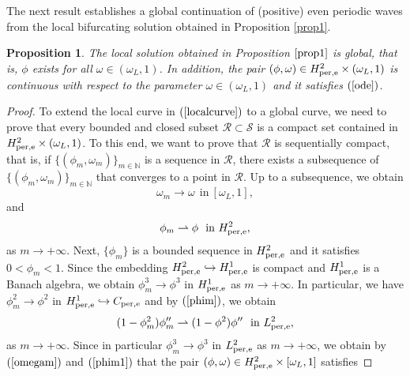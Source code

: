 \documentclass[12pt,reqno]{amsart}
\numberwithin{equation}{section}
\numberwithin{figure}{section}
\newtheorem{proposition}[theorem]{Proposition}
\begin{document}
The next result establishes a global continuation of (positive) even periodic waves from the local bifurcating solution obtained in Proposition \ref{prop1}.
	
	\begin{proposition}\label{prop2}
		The local solution obtained in Proposition $\ref{prop1}$ is global, that is, $\phi$ exists for all $\omega\in \left(\omega_L,1\right)$. In addition, the pair $(\phi,\omega)\in H_{\rm per,e}^2\times\left(\omega_L,1\right)$ is continuous with respect to the parameter $\omega\in \left(\omega_L,1\right)$ and it satisfies $(\ref{ode})$.
		\end{proposition}
	
		\begin{proof}
			To extend the local curve in $(\ref{localcurve})$ to a global curve, we need to prove that every bounded and closed subset $\mathcal{R}\subset \mathcal{S}$ is a compact set contained in $H_{\rm per,e}^2\times \left(\omega_L,1\right)$. To this end, we want to prove that $\mathcal{R}$ is sequentially compact, that is, if $\{(\phi_m,\omega_m)\}_{m\in\mathbb{N}}$ is a sequence in $\mathcal{R}$, there exists a subsequence of $\{(\phi_m,\omega_m)\}_{m\in\mathbb{N}}$ that converges to a point in $\mathcal{R}$. Up to a subsequence, we obtain 
			\begin{equation}\label{omegam}
				\omega_m\rightarrow \omega\ \ \mbox{in}\ \left[\omega_L,1\right],
				\end{equation}
				and 
			\begin{equation}\label{phim}
				\phi_m\rightharpoonup \phi\ \ \mbox{in}\ H_{\rm per,e}^2,
			\end{equation}	
			as $m\rightarrow +\infty$. Next, $\{\phi_m\}$ is a bounded sequence in $H_{\rm per,e}^2$ and it satisfies $0<\phi_m<1$. Since the embedding $H_{\rm per,e}^2\hookrightarrow H_{\rm per,e}^1$ is compact and $H_{\rm per,e}^1$ is a Banach algebra, we obtain $\phi_m^3\rightarrow \phi^3$ in $H_{\rm per,e}^1$ as $m \rightarrow +\infty$. In particular, we have $\phi_m^2\rightarrow \phi^2$ in $H_{\rm per,e}^1\hookrightarrow C_{\rm per,e}$ and by $(\ref{phim})$, we obtain
			\begin{equation}\label{phim1}
				(1-\phi_m^2)\phi_m''\rightharpoonup (1-\phi^2)\phi''\ \ \mbox{in}\ L_{\rm per,e}^2,
			\end{equation}
			as $m \rightarrow +\infty$. Since in particular $\phi_m^3\rightarrow \phi^3$ in $L_{\rm per,e}^2$ as $m \rightarrow +\infty$, we obtain by $(\ref{omegam})$ and $(\ref{phim1})$ that the pair $(\phi,\omega)\in H_{\rm per,e}^2\times \left[\omega_L,1\right]$ satisfies

\end{proof}
\end{document}
